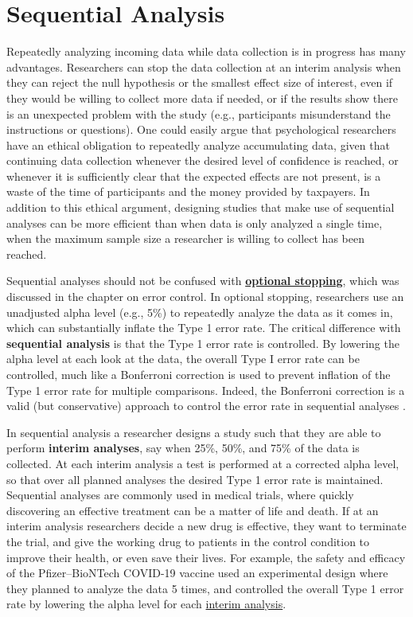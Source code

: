 \documentclass[
  oneside]{book}
\begin{document}
\hypertarget{sequential}{%
\chapter{Sequential Analysis}\label{sequential}}

Repeatedly analyzing incoming data while data collection is in progress has many advantages. Researchers can stop the data collection at an interim analysis when they can reject the null hypothesis or the smallest effect size of interest, even if they would be willing to collect more data if needed, or if the results show there is an unexpected problem with the study (e.g., participants misunderstand the instructions or questions). One could easily argue that psychological researchers have an ethical obligation to repeatedly analyze accumulating data, given that continuing data collection whenever the desired level of confidence is reached, or whenever it is sufficiently clear that the expected effects are not present, is a waste of the time of participants and the money provided by taxpayers. In addition to this ethical argument, designing studies that make use of sequential analyses can be more efficient than when data is only analyzed a single time, when the maximum sample size a researcher is willing to collect has been reached.

Sequential analyses should not be confused with \protect\hyperlink{optionalstopping}{\textbf{optional stopping}}, which was discussed in the chapter on error control. In optional stopping, researchers use an unadjusted alpha level (e.g., 5\%) to repeatedly analyze the data as it comes in, which can substantially inflate the Type 1 error rate. The critical difference with \textbf{sequential analysis} is that the Type 1 error rate is controlled. By lowering the alpha level at each look at the data, the overall Type I error rate can be controlled, much like a Bonferroni correction is used to prevent inflation of the Type 1 error rate for multiple comparisons. Indeed, the Bonferroni correction is a valid (but conservative) approach to control the error rate in sequential analyses \citep{wassmer_group_2016}.

In sequential analysis a researcher designs a study such that they are able to perform \textbf{interim analyses}, say when 25\%, 50\%, and 75\% of the data is collected. At each interim analysis a test is performed at a corrected alpha level, so that over all planned analyses the desired Type 1 error rate is maintained. Sequential analyses are commonly used in medical trials, where quickly discovering an effective treatment can be a matter of life and death. If at an interim analysis researchers decide a new drug is effective, they want to terminate the trial, and give the working drug to patients in the control condition to improve their health, or even save their lives. For example, the safety and efficacy of the Pfizer--BioNTech COVID-19 vaccine used an experimental design where they planned to analyze the data 5 times, and controlled the overall Type 1 error rate by lowering the alpha level for each \href{https://www.nejm.org/doi/suppl/10.1056/NEJMoa2034577/suppl_file/nejmoa2034577_protocol.pdf}{interim analysis}.
\end{document}

